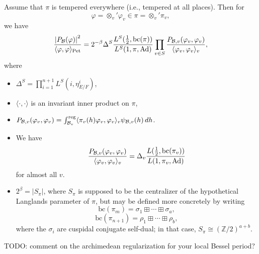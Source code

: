 \documentclass[reqno]{amsart} 
\begin{document}
\begin{theorem}\label{theorem:cj4394av15}
  Assume that $\pi$ is tempered everywhere (i.e., tempered at all places).  Then for
  \begin{equation*}
    \varphi = \otimes_v ' \varphi_v \in \pi = \otimes_v ' \pi_v,
  \end{equation*}
  we have
  \begin{equation*}
    \frac{\left\lvert P_{\mathcal{B} } (\varphi)  \right\rvert^2 }{
      \langle \varphi, \varphi  \rangle_{\mathrm{Pet}}
    }
    =
    2^{- \beta }
    \Delta^S 
    \frac{L^S  (\tfrac{1}{2}, \mathrm{bc} (\pi) )}{L^S  (1, \pi, \operatorname{Ad})}
    \prod_{v \in S}
    \frac{
      P_{\mathcal{B}, v}
      (\varphi_v, \varphi_v )
    }{\langle \varphi_v, \varphi_v  \rangle_v },
  \end{equation*}
  where
  \begin{itemize}
  \item $\Delta^S = \prod_{i = 1 }^{n + 1} L^S (i, \eta^i_{E/F})$, 
  \item $\langle \cdot, \cdot  \rangle$ is an invariant inner product on $\pi$,
  \item $P_{\mathcal{B}, v} (\varphi_v, \varphi_v ) = \int_{\mathcal{B}_v }^{\operatorname{reg}} \langle \pi_v (h) \varphi_v, \varphi_v  \rangle_v
    \psi_{\mathcal{B}, v} (h) \, d h$.
  \item We have
    \begin{equation*}
      \frac{P_{\mathcal{B}, v} (\varphi_v, \varphi_v)}{ \langle \varphi_v, \varphi_v  \rangle_v }
      = \Delta_v \frac{L (\tfrac{1}{2}, \mathrm{bc} (\pi_v ))}{ L (1, \pi_v , \operatorname{Ad})}
    \end{equation*}
    for almost all $v$.
  \item $2^\beta = \left\lvert S_\pi \right\rvert$, where $S_\pi $ is supposed to be the centralizer of the hypothetical Langlands parameter of $\pi$, but may be defined more concretely by writing
    \begin{equation*}
\mathrm{bc} (\pi_m ) = \sigma_1 \boxplus \dotsb \boxplus \sigma_a,
    \end{equation*}
    \begin{equation*}
\mathrm{bc} (\pi_{n + 1}) = \rho_1 \boxplus \dotsb \boxplus \rho_b,
    \end{equation*}
    where the $\sigma_i $ are cuspidal conjugate self-dual; in that case, $S_\pi \cong (\mathbb{Z} / 2)^{a + b}$.
  \end{itemize}
  TODO: comment on the archimedean regularization for your local Bessel period?
\end{theorem}
\end{document}
